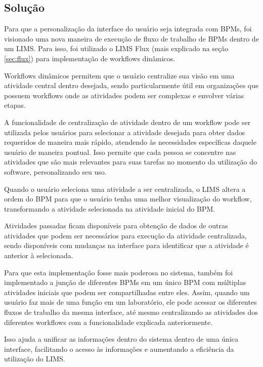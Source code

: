 \subsection{Solução}


Para que a personalização da interface do usuário seja integrada com BPMs, foi visionado uma nova maneira de execução de fluxo de trabalho de BPMs dentro de um LIMS. Para isso, foi utilizado o LIMS Flux (mais explicado na seção \ref{sec:flux}) para implementação de workflows dinâmicos.

Workflows dinâmicos permitem que o usuário centralize sua visão em uma atividade central dentro desejada, sendo particularmente útil em organizações que possuem workflows onde as atividades podem ser complexas e envolver várias etapas.


A funcionalidade de centralização de atividade dentro de um workflow pode ser utilizada pelos usuários para selecionar a atividade desejada para obter dados requeridos de maneira mais rápido, atendendo às necessidades específicas daquele usuário de maneira pontual. Isso permite que cada pessoa se concentre nas atividades que são mais relevantes para suas tarefas no momento da utilização do software, personalizando seu uso.

Quando o usuário seleciona uma atividade a ser centralizada, o LIMS altera a ordem do BPM para que o usuário tenha uma melhor visualização do workflow, transformando a atividade selecionada na atividade inicial do BPM.

Atividades passadas ficam disponíveis para obtenção de dados de outras atividades que podem ser necessários para execução da atividade centralizada, sendo disponíveis com mudanças na interface para identificar que a atividade é anterior à selecionada.


Para que esta implementação fosse mais poderosa no sistema, também foi implementado a junção de diferentes BPMs em um único BPM com múltiplas atividades iniciais que podem ser compartilhadas entre eles. Assim, quando um usuário faz mais de uma função em um laboratório, ele pode acessar os diferentes fluxos de trabalho da mesma interface, até mesmo centralizando as atividades dos diferentes workflows com a funcionalidade explicada anteriormente.

Isso ajuda a unificar as informações dentro do sistema dentro de uma única interface, facilitando o acesso às informações e aumentando a eficiência da utilização do LIMS. 



